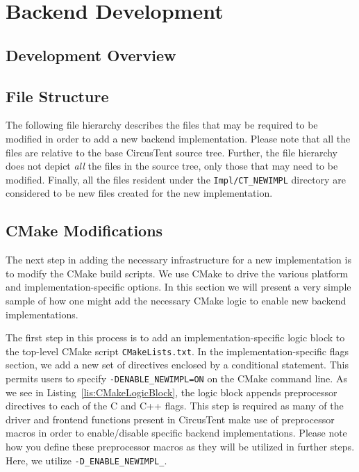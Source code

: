 \documentclass{article}
\begin{document}
\section{Backend Development}
\label{sec:BackendDev}

\subsection{Development Overview}
\label{sec:DevelopmentOverview}

\clearpage
\subsection{File Structure}
\label{sec:FileStructure}

The following file hierarchy describes the files that may be required to be modified 
in order to add a new backend implementation.  Please note that all the files are 
relative to the base CircusTent source tree.  Further, the file hierarchy does not 
depict \textit{all} the files in the source tree, only those that may need to be modified.  
Finally, all the files resident under the \texttt{Impl/CT\_NEWIMPL} directory are considered 
to be new files created for the new implementation.  

\vspace{0.125in}

\clearpage
\subsection{CMake Modifications}
\label{sec:CMakeMods}

The next step in adding the necessary infrastructure for a new implementation 
is to modify the CMake build scripts.  We use CMake to drive the various platform 
and implementation-specific options.  In this section we will present a very simple 
sample of how one might add the necessary CMake logic to enable new backend implementations.  

The first step in this process is to add an implementation-specific logic block to the 
top-level CMake script \texttt{CMakeLists.txt}.  In the implementation-specific flags section, 
we add a new set of directives enclosed by a conditional statement.  This permits users
to specify \texttt{-DENABLE\_NEWIMPL=ON} on the CMake command line.  As we see 
in Listing~\ref{lis:CMakeLogicBlock}, the logic block appends preprocessor directives 
to each of the C and C++ flags.  This step is required as many of the driver and frontend 
functions present in CircusTent make use of preprocessor macros in order to enable/disable 
specific backend implementations.  Please note how you define these preprocessor macros 
as they will be utilized in further steps.  Here, we utilize \texttt{-D\_ENABLE\_NEWIMPL\_}.  
\end{document}
